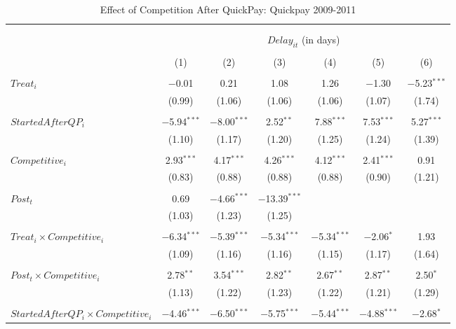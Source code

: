 \documentclass[]{article}
\begin{document}
\begin{table}[H] \centering 
  \caption{Effect of Competition After QuickPay: Quickpay 2009-2011} 
  \label{} 
\small 
\begin{tabular}{@{\extracolsep{-3pt}}lcccccc} 
\\[-1.8ex]\hline 
\hline \\[-1.8ex] 
\\[-1.8ex] & \multicolumn{6}{c}{$Delay_{it}$ (in days)} \\ 
\\[-1.8ex] & (1) & (2) & (3) & (4) & (5) & (6)\\ 
\hline \\[-1.8ex] 
 $Treat_i$ & $-$0.01 & 0.21 & 1.08 & 1.26 & $-$1.30 & $-$5.23$^{***}$ \\ 
  & (0.99) & (1.06) & (1.06) & (1.06) & (1.07) & (1.74) \\ 
  & & & & & & \\ 
 $StartedAfterQP_i$ & $-$5.94$^{***}$ & $-$8.00$^{***}$ & 2.52$^{**}$ & 7.88$^{***}$ & 7.53$^{***}$ & 5.27$^{***}$ \\ 
  & (1.10) & (1.17) & (1.20) & (1.25) & (1.24) & (1.39) \\ 
  & & & & & & \\ 
 $Competitive_i$ & 2.93$^{***}$ & 4.17$^{***}$ & 4.26$^{***}$ & 4.12$^{***}$ & 2.41$^{***}$ & 0.91 \\ 
  & (0.83) & (0.88) & (0.88) & (0.88) & (0.90) & (1.21) \\ 
  & & & & & & \\ 
 $Post_t$ & 0.69 & $-$4.66$^{***}$ & $-$13.39$^{***}$ &  &  &  \\ 
  & (1.03) & (1.23) & (1.25) &  &  &  \\ 
  & & & & & & \\ 
 $Treat_i \times Competitive_i$ & $-$6.34$^{***}$ & $-$5.39$^{***}$ & $-$5.34$^{***}$ & $-$5.34$^{***}$ & $-$2.06$^{*}$ & 1.93 \\ 
  & (1.09) & (1.16) & (1.16) & (1.15) & (1.17) & (1.64) \\ 
  & & & & & & \\ 
 $Post_t \times Competitive_i$ & 2.78$^{**}$ & 3.54$^{***}$ & 2.82$^{**}$ & 2.67$^{**}$ & 2.87$^{**}$ & 2.50$^{*}$ \\ 
  & (1.13) & (1.22) & (1.23) & (1.22) & (1.21) & (1.29) \\ 
  & & & & & & \\ 
 $StartedAfterQP_i \times Competitive_i$ & $-$4.46$^{***}$ & $-$6.50$^{***}$ & $-$5.75$^{***}$ & $-$5.44$^{***}$ & $-$4.88$^{***}$ & $-$2.68$^{*}$ \\ 

\end{tabular}
\end{table}
\end{document}
